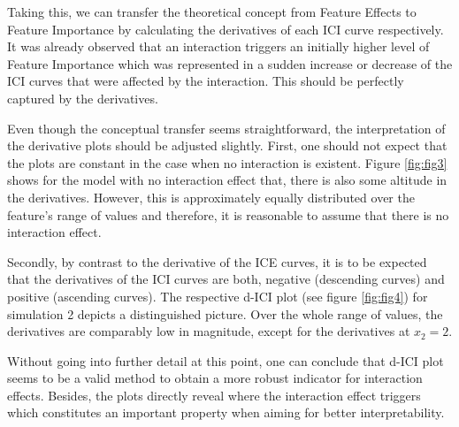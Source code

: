 \documentclass[]{krantz}
\begin{document}
Taking this, we can transfer the theoretical concept from Feature
Effects to Feature Importance by calculating the derivatives of each ICI
curve respectively. It was already observed that an interaction triggers
an initially higher level of Feature Importance which was represented in
a sudden increase or decrease of the ICI curves that were affected by
the interaction. This should be perfectly captured by the derivatives.

Even though the conceptual transfer seems straightforward, the
interpretation of the derivative plots should be adjusted slightly.
First, one should not expect that the plots are constant in the case
when no interaction is existent. Figure \ref{fig:fig3} shows for the
model with no interaction effect that, there is also some altitude in
the derivatives. However, this is approximately equally distributed over
the feature's range of values and therefore, it is reasonable to assume
that there is no interaction effect.

Secondly, by contrast to the derivative of the ICE curves, it is to be
expected that the derivatives of the ICI curves are both, negative
(descending curves) and positive (ascending curves). The respective
d-ICI plot (see figure \ref{fig:fig4}) for simulation 2 depicts a
distinguished picture. Over the whole range of values, the derivatives
are comparably low in magnitude, except for the derivatives at
\(x_{2} = 2\).

Without going into further detail at this point, one can conclude that
d-ICI plot seems to be a valid method to obtain a more robust indicator
for interaction effects. Besides, the plots directly reveal where the
interaction effect triggers which constitutes an important property when
aiming for better interpretability.
\end{document}
